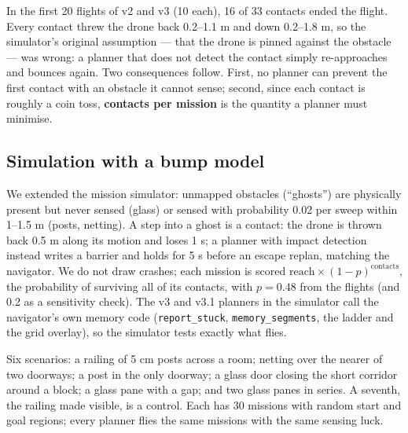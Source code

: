 \documentclass[
]{article}
\begin{document}
In the first 20 flights of v2 and v3 (10 each), 16 of 33 contacts ended
the flight. Every contact threw the drone back 0.2--1.1 m and down
0.2--1.8 m, so the simulator's original assumption --- that the drone is
pinned against the obstacle --- was wrong: a planner that does not
detect the contact simply re-approaches and bounces again. Two
consequences follow. First, no planner can prevent the first contact
with an obstacle it cannot sense; second, since each contact is roughly
a coin toss, \textbf{contacts per mission} is the quantity a planner
must minimise.

\subsection{Simulation with a bump
model}\label{simulation-with-a-bump-model}

We extended the mission simulator: unmapped obstacles (``ghosts'') are
physically present but never sensed (glass) or sensed with probability
0.02 per sweep within 1--1.5 m (posts, netting). A step into a ghost is
a contact: the drone is thrown back 0.5 m along its motion and loses 1
s; a planner with impact detection instead writes a barrier and holds
for 5 s before an escape replan, matching the navigator. We do not draw
crashes; each mission is scored
\(\text{reach}\times(1-p)^{\text{contacts}}\), the probability of
surviving all of its contacts, with \(p = 0.48\) from the flights (and
0.2 as a sensitivity check). The v3 and v3.1 planners in the simulator
call the navigator's own memory code (\texttt{report\_stuck},
\texttt{memory\_segments}, the ladder and the grid overlay), so the
simulator tests exactly what flies.

Six scenarios: a railing of 5 cm posts across a room; netting over the
nearer of two doorways; a post in the only doorway; a glass door closing
the short corridor around a block; a glass pane with a gap; and two
glass panes in series. A seventh, the railing made visible, is a
control. Each has 30 missions with random start and goal regions; every
planner flies the same missions with the same sensing luck.
\end{document}
